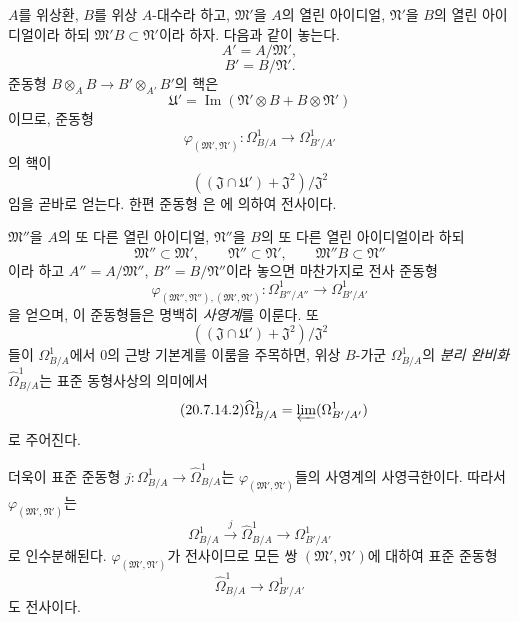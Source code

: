\begin{env}[20.7.14]
\label{0.20.7.14-ko}
$A$를 위상환, $B$를 위상 $A$-대수라 하고, $\mathfrak M'$을 $A$의
열린 아이디얼, $\mathfrak N'$을 $B$의 열린 아이디얼이라 하되
$\mathfrak M'B\subset\mathfrak N'$이라 하자. 다음과 같이 놓는다.
\[
  A'=A/\mathfrak M',
\]
\[
  B'=B/\mathfrak N'.
\]
준동형 $B\otimes_A B\to B'\otimes_{A'}B'$의 핵은
\[
  \mathfrak U'
  =\operatorname{Im}(\mathfrak N'\otimes B+B\otimes\mathfrak N')
\]
이므로, 준동형
\begin{equation}
\tag{20.7.14.1}
\label{0.20.7.14.1-ko}
  \varphi_{(\mathfrak M',\mathfrak N')}:
  \Omega^1_{B/A}\longrightarrow\Omega^1_{B'/A'}
\end{equation}
의 핵이
\[
  ((\mathfrak J\cap\mathfrak U')+\mathfrak J^2)/\mathfrak J^2
\]
임을 곧바로 얻는다. 한편 준동형 은
에 의하여 전사이다.

$\mathfrak M''$을 $A$의 또 다른 열린 아이디얼, $\mathfrak N''$을
$B$의 또 다른 열린 아이디얼이라 하되
\[
  \mathfrak M''\subset\mathfrak M',\qquad
  \mathfrak N''\subset\mathfrak N',\qquad
  \mathfrak M''B\subset\mathfrak N''
\]
이라 하고 $A''=A/\mathfrak M''$, $B''=B/\mathfrak N''$이라 놓으면
마찬가지로 전사 준동형
\[
  \varphi_{(\mathfrak M'',\mathfrak N''),(\mathfrak M',\mathfrak N')}:
  \Omega^1_{B''/A''}\longrightarrow\Omega^1_{B'/A'}
\]
을 얻으며, 이 준동형들은 명백히 \emph{사영계}를 이룬다.
또
\[
  ((\mathfrak J\cap\mathfrak U')+\mathfrak J^2)/\mathfrak J^2
\]
들이 $\Omega^1_{B/A}$에서 $0$의 근방 기본계를 이룸을 주목하면, 위상
$B$-가군 $\Omega^1_{B/A}$의 \emph{분리 완비화}
$\widehat{\Omega}^1_{B/A}$는 표준 동형사상의 의미에서
\begin{equation}
\tag{20.7.14.2}
\label{0.20.7.14.2-ko}
  \widehat{\Omega}^1_{B/A}
  =\varprojlim(\Omega^1_{B'/A'})
\end{equation}
로 주어진다.

더욱이 표준 준동형
$j:\Omega^1_{B/A}\to\widehat{\Omega}^1_{B/A}$는
$\varphi_{(\mathfrak M',\mathfrak N')}$들의 사영계의 사영극한이다.
따라서 $\varphi_{(\mathfrak M',\mathfrak N')}$는
\[
  \Omega^1_{B/A}\xrightarrow{j}\widehat{\Omega}^1_{B/A}
  \longrightarrow\Omega^1_{B'/A'}
\]
로 인수분해된다. $\varphi_{(\mathfrak M',\mathfrak N')}$가 전사이므로 모든 쌍
$(\mathfrak M',\mathfrak N')$에 대하여 표준 준동형
\begin{equation}
\tag{20.7.14.3}
\label{0.20.7.14.3-ko}
  \widehat{\Omega}^1_{B/A}\longrightarrow\Omega^1_{B'/A'}
\end{equation}
도 전사이다.


\end{env}
